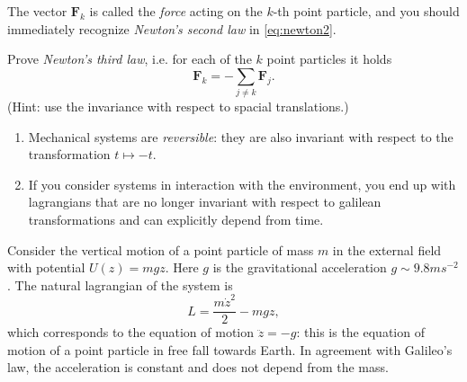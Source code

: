 \documentclass[english,fontsize=11pt,paper=a5,oneside]{scrbook}
\theoremstyle{definition}
\newenvironment{remark}
  {\pushQED{\qed}\renewcommand{\qedsymbol}{$\lozenge$}\remarkx}
  {\popQED\endremarkx}
\newenvironment{example}
  {\pushQED{\qed}\renewcommand{\qedsymbol}{$\lozenge$}\examplex}
  {\popQED\endexamplex}
\newenvironment{exercise}
  {\pushQED{\qed}\renewcommand{\qedsymbol}{$\maltese$}\exercisex}
  {\popQED\endexercisex}
\begin{document}
The vector $\bm{F}_k$ is called the \emph{force} acting on the $k$-th point particle, and you should immediately recognize \emph{Newton's second law} in \eqref{eq:newton2}.

\begin{exercise}\label{ex:N3l1}
    Prove \emph{Newton's third law}, i.e. for each of the $k$ point particles it holds
    \begin{equation}
        \bm{F}_k = -\sum_{j\neq k} \bm{F}_j.
    \end{equation}
    (Hint: use the invariance with respect to spacial translations.)
\end{exercise}

\begin{remark}
\begin{enumerate}
    \item Mechanical systems are \emph{reversible}: they are also invariant with respect to the transformation $t\mapsto -t$.
    \item If you consider systems in interaction with the environment, you end up with lagrangians that are no longer invariant with respect to galilean transformations and can explicitly depend from time.
\end{enumerate}
\end{remark}

\begin{example}
    Consider the vertical motion of a point particle of mass $m$ in the external field with potential $U(z) = m g z$. Here $g$ is the gravitational acceleration $g \sim 9.8 m s^{-2}$. The natural lagrangian of the system is
    \begin{equation}
        L = \frac{m\dot z^2}2 - mgz,
    \end{equation}
    which corresponds to the equation of motion $\ddot z = -g$: this is the equation of motion of a point particle in free fall towards Earth. In agreement with Galileo's law, the acceleration is constant and does not depend from the mass.
\end{example}
\end{document}
